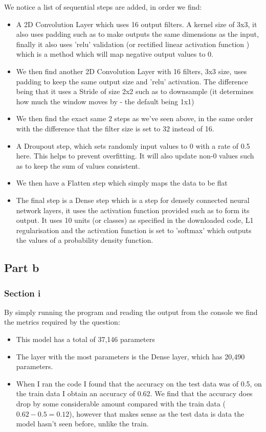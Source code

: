 \documentclass[10pt]{article}
\begin{document}
We notice a list of sequential steps are added, in order we find:

\begin{itemize}
    \item A 2D Convolution Layer which uses 16 output filters. A kernel size of 3x3,
    it also uses padding such as to make outputs the same dimensions as the input, finally
    it also uses 'relu' validation (or rectified linear activation function 
    ) which is a method which will map negative output values to 0.
    \item We then find another 2D Convolution Layer with 16 filters,
    3x3 size, uses padding to keep the same output size and 'relu' activation. The
    difference being that it uses a Stride of size 2x2 such as to downsample
    (it determines how much the window moves by - the default being 1x1)
    \item We then find the exact same 2 steps as we've seen above, in the
    same order with the difference that the filter size is set to 32 instead of 16.
    \item A Droupout step, which sets randomly input values to 0
    with a rate of 0.5 here. This helps to prevent overfitting. It will also
    update non-0 values such as to keep the sum of values consistent.
    \item We then have a Flatten step which simply maps the data to be flat
    \item The final step is a Dense step which is a step for densely connected neural network layers,
    it uses the activation function provided such as to form its output. It uses 10 units (or classes) as specified
    in the downloaded code, L1 regularisation and the activation function is set to
    'softmax' which outputs the values of a probability density function.
\end{itemize}

\subsection*{Part b}
\subsubsection*{Section i}
By simply running the program and reading the output from the
console we find the metrics required by the question:

\begin{itemize}
    \item This model has a total of 37,146 parameters
    \item The layer with the most parameters is the Dense layer,
    which has 20,490 parameters.
    \item When I ran the code I found that the accuracy on the
    test data was of 0.5, on the train data I obtain an accuracy
    of 0.62. We find that the accuracy does drop by some considerable
    amount compared with the train data ($0.62 - 0.5 = 0.12$), however that makes sense
    as the test data is data the model hasn't seen before, unlike the train.
\end{itemize}
\end{document}
